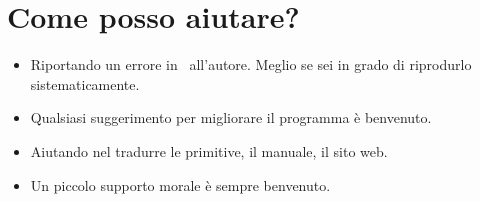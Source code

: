 \section{Come posso aiutare?}
\begin{itemize}
	\item Riportando un errore in \xlogo\ all'autore. Meglio se sei in grado di riprodurlo sistematicamente.
	\item Qualsiasi suggerimento per migliorare il programma è benvenuto.
	\item Aiutando nel tradurre le primitive, il manuale, il sito web.
	\item Un piccolo supporto morale è sempre benvenuto.
\end{itemize}
